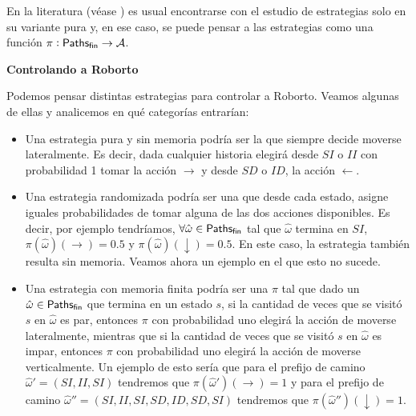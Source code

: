 En la literatura (véase \cite{BaierKatoen, AlfaroThesis}) es usual encontrarse
con el estudio de estrategias solo en su variante pura y, en ese caso, se puede
pensar a las estrategias como una función $\pi: \textsf{Paths}_\textsf{fin} \rightarrow \mathcal{A}$.

\textbf{Controlando a Roborto}

Podemos pensar distintas estrategias para controlar a Roborto. Veamos algunas
de ellas y analicemos en qué categorías entrarían:

\begin{itemize}
	\item Una estrategia pura y sin memoria podría ser la que siempre decide moverse
	      lateralmente. Es decir, dada cualquier historia elegirá desde $SI$ o $II$ con
	      probabilidad 1 tomar la acción $\rightarrow$ y desde $SD$ o $ID$, la acción
	      $\leftarrow$.
	\item Una estrategia randomizada podría ser una que desde cada estado, asigne iguales
	      probabilidades de tomar alguna de las dos acciones disponibles. Es decir, por
	      ejemplo tendríamos, $\forall \hat \omega \in \textsf{Paths}_\textsf{fin}$ tal que $\hat \omega$
	      termina en $SI$, $\pi(\hat \omega)(\rightarrow) = 0.5$ y $\pi(\hat
		      \omega)(\downarrow) = 0.5$.
	      En este caso, la estrategia también resulta sin memoria. Veamos ahora un
	      ejemplo en el que esto no sucede.
	\item Una estrategia con memoria finita podría ser una $\pi$ tal que dado un $\hat
		      \omega \in \textsf{Paths}_\textsf{fin}$ que termina en un estado $s$, si la cantidad de veces que
	      se visitó $s$ en $\hat \omega$ es par, entonces $\pi$ con probabilidad uno
	      elegirá la acción de moverse lateralmente, mientras que si la cantidad de veces
	      que se visitó $s$ en $\hat \omega$ es impar, entonces $\pi$ con probabilidad
	      uno elegirá la acción de moverse verticalmente. Un ejemplo de esto sería que
	      para el prefijo de camino $\hat \omega' = (SI, II, SI)$ tendremos que $\pi(\hat
		      \omega')(\rightarrow) = 1$ y para el prefijo de camino $\hat \omega''=(SI, II,
		      SI, SD, ID, SD, SI)$ tendremos que $\pi(\hat \omega'')(\downarrow) = 1$.
\end{itemize}



